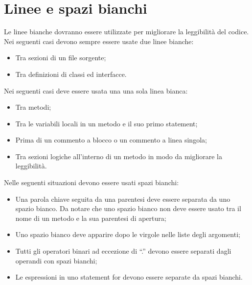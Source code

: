 \documentclass[11pt,titlepage,a4paper]{report}
\begin{document}
\section{Linee e spazi bianchi}
Le linee bianche dovranno essere utilizzate per migliorare la leggibilit\`a del codice. Nei seguenti casi devono sempre essere usate due linee bianche:
\begin{itemize}
\item Tra sezioni di un file sorgente;
\item Tra definizioni di classi ed interfacce.
\end{itemize}
Nei seguenti casi deve essere usata una una sola linea bianca:
\begin{itemize}
\item Tra metodi;
\item Tra le variabili locali in un metodo e il suo primo statement;
\item Prima di un commento a blocco o un commento a linea singola;
\item Tra sezioni logiche all'interno di un metodo in modo da migliorare la leggibilità.
\end{itemize}
Nelle seguenti situazioni devono essere usati spazi bianchi:
\begin{itemize}
\item Una parola chiave seguita da una parentesi deve essere separata da uno spazio bianco. Da notare che uno spazio bianco non deve essere usato tra il nome di un metodo e la sua parentesi di apertura;
\item Uno spazio bianco deve apparire dopo le virgole nelle liste degli argomenti;
\item Tutti gli operatori binari ad eccezione di “.” devono essere separati dagli operandi con spazi bianchi;
\item Le espressioni in uno statement for devono essere separate da spazi bianchi.
\end{itemize}
\end{document}
